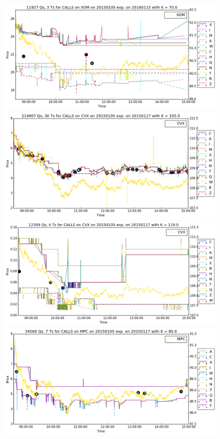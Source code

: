\documentclass[a4paper,12pt]{article}
\theoremstyle{plain}
\theoremstyle{definition}
\begin{document}
\begin{figure}[H]
\begin{center}
 \includegraphics[width=\linewidth]{figures/contract_pics/XOM_middle.png}
 \endminipage\\
  \vspace{5mm}
 \includegraphics[width=\linewidth]{figures/contract_pics/CVX_top.png}
 \endminipage
 \hspace{3mm}
 \includegraphics[width=\linewidth]{figures/contract_pics/CVX_middle.png}
 \endminipage\\
  \vspace{5mm}
 \includegraphics[width=\linewidth]{figures/contract_pics/MPC_top.png}

\end{center}
\end{figure}
\end{document}
